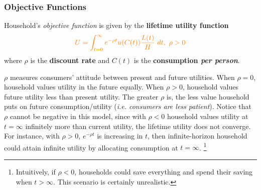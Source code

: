 \documentclass[]{article}
\begin{document}
	\subsubsection{Objective Functions}
	\par Household's \emph{objective function} is given by the \textbf{lifetime utility function}
	\begin{equation}
		\textcolor{orange}{
			U = \int_{t=0}^\infty {e^{-\rho t} u(C(t)) \frac{L(t)}{H}}\ dt,\ \rho > 0
		}
	\end{equation}
	where $\rho$ is the \textbf{discount rate} and $C(t)$ is the \textbf{consumption \emph{per person}}.
	\begin{remark}
		$\rho$ measures consumers' attitude between present and future utilities.
		When $\rho = 0$, household values utility in the future equally. 
		When $\rho > 0$, household values future utility less than present utility.
		The greater $\rho$ is, the less value household puts on future consumption/utility (\emph{i.e. consumers are less patient}).
		Notice that $\rho$ cannot be negative in this model, since with $\rho < 0$ household values utility at $t=\infty$ infinitely more than current utility, the lifetime utility does not converge. For instance, with $\rho>0$, $e^{-\rho t}$ is increasing in $t$, then infinite-horizon household could attain infinite utility by allocating consumption at $t=\infty$.
		\footnote{Intuitively, if $\rho < 0$, households could save everything and spend their saving when $t > \infty$. This scenario is certainly unrealistic.}
	\end{remark}
	
\end{document}
